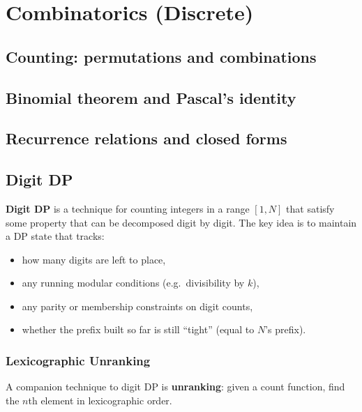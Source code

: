 
\section{Combinatorics (Discrete)}

\subsection{Counting: permutations and combinations}


\subsection{Binomial theorem and Pascal's identity}


\subsection{Recurrence relations and closed forms}


\subsection{Digit DP}

\textbf{Digit DP} is a technique for counting integers in a range $[1, N]$ that satisfy some property that can be decomposed digit by digit. The key idea is to maintain a DP state that tracks:
\begin{itemize}
    \item how many digits are left to place,
    \item any running modular conditions (e.g.\ divisibility by $k$),
    \item any parity or membership constraints on digit counts,
    \item whether the prefix built so far is still ``tight'' (equal to $N$'s prefix).
\end{itemize}

\subsubsection*{Lexicographic Unranking}

A companion technique to digit DP is \textbf{unranking}: given a count function, find the $n$th element in lexicographic order.


